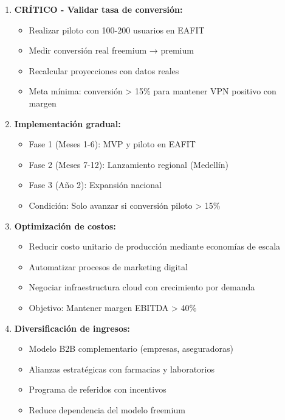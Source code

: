 \begin{enumerate}
    \item \textbf{CRÍTICO - Validar tasa de conversión:}
    \begin{itemize}
        \item Realizar piloto con 100-200 usuarios en EAFIT
        \item Medir conversión real freemium → premium
        \item Recalcular proyecciones con datos reales
        \item Meta mínima: conversión > 15\% para mantener VPN positivo con margen
    \end{itemize}
    
    \item \textbf{Implementación gradual:}
    \begin{itemize}
        \item Fase 1 (Meses 1-6): MVP y piloto en EAFIT
        \item Fase 2 (Meses 7-12): Lanzamiento regional (Medellín)
        \item Fase 3 (Año 2): Expansión nacional
        \item Condición: Solo avanzar si conversión piloto > 15\%
    \end{itemize}
    
    \item \textbf{Optimización de costos:}
    \begin{itemize}
        \item Reducir costo unitario de producción mediante economías de escala
        \item Automatizar procesos de marketing digital
        \item Negociar infraestructura cloud con crecimiento por demanda
        \item Objetivo: Mantener margen EBITDA > 40\%
    \end{itemize}
    
    \item \textbf{Diversificación de ingresos:}
    \begin{itemize}
        \item Modelo B2B complementario (empresas, aseguradoras)
        \item Alianzas estratégicas con farmacias y laboratorios
        \item Programa de referidos con incentivos
        \item Reduce dependencia del modelo freemium
    \end{itemize}
    

\end{enumerate}
